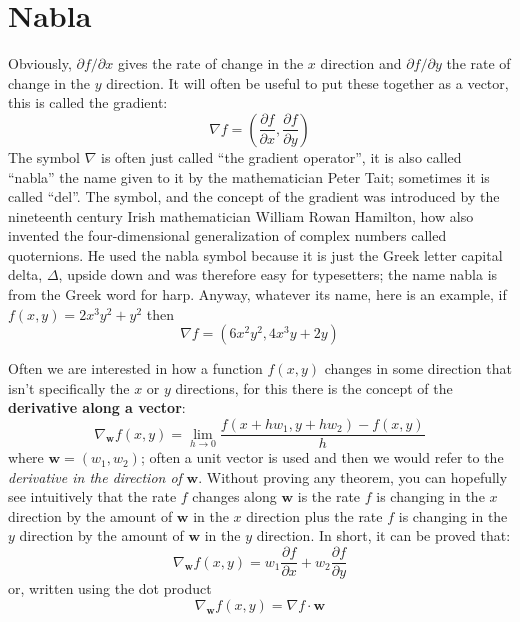 \documentclass[12pt]{article}
\begin{document}
\section*{Nabla}

Obviously, $\partial f/\partial x$ gives the rate of change in the $x$
direction and $\partial f/\partial y$ the rate of change in the $y$
direction. It will often be useful to put these together as a vector, this is called the gradient:
\begin{equation}
  \nabla f=\left(\frac{\partial f}{\partial x},\frac{\partial f}{\partial y}\right)
\end{equation}
The symbol $\nabla$ is often just called ``the gradient operator'', it
is also called ``nabla'' the name given to it by the mathematician
Peter Tait; sometimes it is called ``del''. The symbol, and the
concept of the gradient was introduced by the nineteenth century Irish
mathematician William Rowan Hamilton, how also invented the
four-dimensional generalization of complex numbers called
quoternions. He used the nabla symbol because it is just the Greek
letter capital delta, $\Delta$, upside down and was therefore easy for
typesetters; the name nabla is from the Greek word for harp. Anyway,
whatever its name, here is an example, if $f(x,y)=2x^3y^2+y^2$ then
\begin{equation}
  \nabla f=(6x^2y^2,4x^3y+2y)
\end{equation}

Often we are interested in how a function $f(x,y)$ changes in some
direction that isn't specifically the $x$ or $y$ directions, for this
there is the concept of the \textbf{derivative along a vector}:
\begin{equation}
  \nabla_{\mathbf{w}}f(x,y)=\lim_{h\rightarrow 0}\frac{f(x+hw_1,y+hw_2)-f(x,y)}{h}
\end{equation}
where $\mathbf{w}=(w_1,w_2)$; often a unit vector is used and then we
would refer to the \textsl{derivative in the direction of}
$\textbf{w}$. Without proving any theorem, you can hopefully see
intuitively that the rate $f$ changes along $\textbf{w}$ is the rate
$f$ is changing in the $x$ direction by the amount of $\textbf{w}$ in
the $x$ direction plus the rate $f$ is changing in the $y$ direction
by the amount of $\textbf{w}$ in the $y$ direction. In short, it can
be proved that:
\begin{equation}
  \nabla_{\mathbf{w}}f(x,y)=w_1\frac{\partial f}{\partial x}+w_2\frac{\partial f}{\partial y}
\end{equation}
or, written using the dot product
\begin{equation}
  \nabla_{\mathbf{w}}f(x,y)=\nabla f\cdot \textbf{w}
\end{equation}
\end{document}

